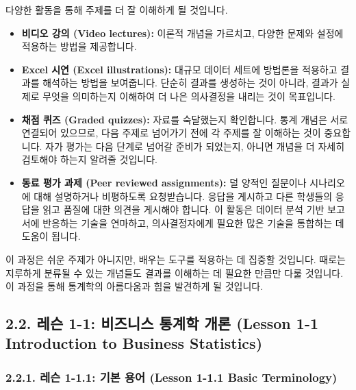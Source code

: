 \documentclass[11pt,a4paper]{article}
\theoremstyle{definition}
\begin{document}
\begin{tcolorbox}[title={어떻게 배우게 될까요? (How Will You Learn?)}]
다양한 활동을 통해 주제를 더 잘 이해하게 될 것입니다.
\begin{itemize}
    \item \textbf{비디오 강의 (Video lectures):} 이론적 개념을 가르치고, 다양한 문제와 설정에 적용하는 방법을 제공합니다.
    \item \textbf{Excel 시연 (Excel illustrations):} 대규모 데이터 세트에 방법론을 적용하고 결과를 해석하는 방법을 보여줍니다. 단순히 결과를 생성하는 것이 아니라, 결과가 실제로 무엇을 의미하는지 이해하여 더 나은 의사결정을 내리는 것이 목표입니다.
    \item \textbf{채점 퀴즈 (Graded quizzes):} 자료를 숙달했는지 확인합니다. 통계 개념은 서로 연결되어 있으므로, 다음 주제로 넘어가기 전에 각 주제를 잘 이해하는 것이 중요합니다. 자가 평가는 다음 단계로 넘어갈 준비가 되었는지, 아니면 개념을 더 자세히 검토해야 하는지 알려줄 것입니다.
    \item \textbf{동료 평가 과제 (Peer reviewed assignments):} 덜 양적인 질문이나 시나리오에 대해 설명하거나 비평하도록 요청받습니다. 응답을 게시하고 다른 학생들의 응답을 읽고 품질에 대한 의견을 게시해야 합니다. 이 활동은 데이터 분석 기반 보고서에 반응하는 기술을 연마하고, 의사결정자에게 필요한 많은 기술을 통합하는 데 도움이 됩니다.
\end{itemize}
이 과정은 쉬운 주제가 아니지만, 배우는 도구를 적용하는 데 집중할 것입니다. 때로는 지루하게 분류될 수 있는 개념들도 결과를 이해하는 데 필요한 만큼만 다룰 것입니다. 이 과정을 통해 통계학의 아름다움과 힘을 발견하게 될 것입니다.
\end{tcolorbox}

\newpage
\subsection{2.2. 레슨 1-1: 비즈니스 통계학 개론 (Lesson 1-1 Introduction to Business Statistics)}

\subsubsection{2.2.1. 레슨 1-1.1: 기본 용어 (Lesson 1-1.1 Basic Terminology)}
\end{document}
